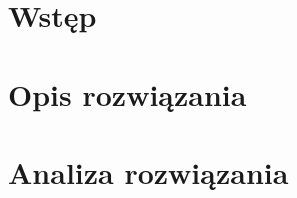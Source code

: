 \documentclass[a4paper,11pt,twoside]{report}
\theoremstyle{definition}
\begin{document}
\null\thispagestyle{empty}\newpage

%
%
%

\null\thispagestyle{empty}\newpage

%
%

%
%
\null\thispagestyle{empty}\newpage

\tableofcontents
\thispagestyle{empty}

\newpage %

\null\thispagestyle{empty}\newpage
\pagestyle{fancy}
\setcounter{page}{11} %

\chapter{Wstęp}



\chapter{Opis rozwiązania}



\chapter{Analiza rozwiązania}


\end{document}
